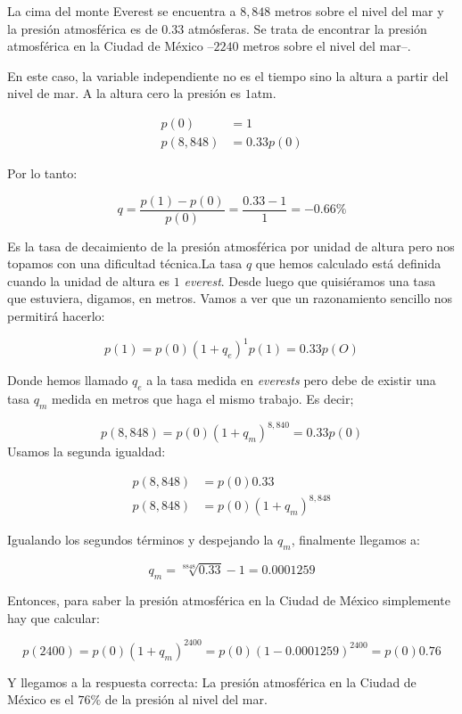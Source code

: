 \begin{ejemplo}

\noindent  La cima del monte Everest se encuentra a $8,848$ metros sobre el nivel del mar y la presión atmosférica es de $0.33$ atmósferas. Se trata de encontrar la presión atmosférica en la Ciudad de México --$2240$ metros sobre el nivel del mar--.

En este caso, la variable independiente no es el tiempo sino la altura a partir del nivel de mar. A la altura cero la presión es $1$atm. 

\begin{align*}
  p(0) &= 1 \\
  p(8,848) &= 0.33p(0)
\end{align*}

Por lo tanto:

\[
q=\dfrac{p(1)-p(0)}{p(0)}=\dfrac{0.33-1}{1}=-0.66\%
\]

Es la tasa de decaimiento de la presión atmosférica por unidad de altura pero nos topamos con una dificultad técnica.La tasa $q$ que hemos calculado está definida cuando la unidad de altura es $1$ \emph{everest}. Desde luego que quisiéramos una tasa que estuviera, digamos, en metros. Vamos a ver que un razonamiento sencillo nos permitirá hacerlo:

\[
p(1)=p(0)(1+q_e)^1
p(1)=0.33p(O)
\]

Donde hemos llamado $q_e$ a la tasa medida en \emph{everests} pero debe de existir una tasa $q_m$ medida en metros que haga el mismo trabajo. Es decir;

\[
p(8,848)=p(0)(1+q_m)^{8,840}=0.33p(0)
\]
Usamos la segunda igualdad:


\begin{align*}
p(8,848) &=p(0)0.33\\
p(8,848) &=p(0)(1+q_m)^{8,848}
\end{align*}

Igualando los segundos términos y despejando la $q_m$, finalmente llegamos a:

\[
q_m=\sqrt[8848]{0.33}-1=0.0001259
\]



 Entonces, para saber la presión atmosférica en la Ciudad de México simplemente hay que calcular:

\[
p(2400)=p(0)(1+q_m)^{2400}=p(0)(1-0.0001259)^{2400}=p(0)0.76
\]

Y llegamos a la respuesta correcta: La presión atmosférica en la Ciudad de México es el $76\%$ de la presión al nivel del mar.

\end{ejemplo}



